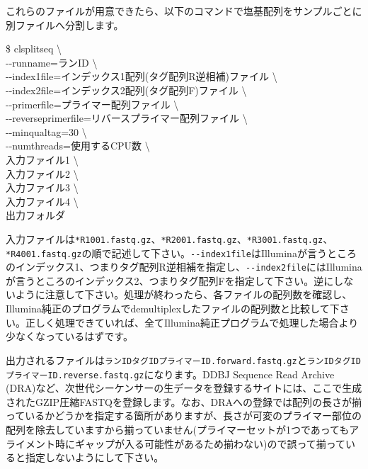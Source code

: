 \documentclass[titlepage,10pt,a4paper,english]{jsbook}
\newenvironment{cmd}{\begin{oframed}\raggedright\ttfamily\footnotesize\setlength{\baselineskip}{1.4em}}{\end{oframed}\vspace{-1em}}
\begin{document}
これらのファイルが用意できたら、以下のコマンドで塩基配列をサンプルごとに別ファイルへ分割します。
\begin{cmd}
\$ clsplitseq {\textbackslash}\\
{-}{-}runname=ランID {\textbackslash}\\
{-}{-}index1file=インデックス1配列(タグ配列R逆相補)ファイル {\textbackslash}\\
{-}{-}index2file=インデックス2配列(タグ配列F)ファイル {\textbackslash}\\
{-}{-}primerfile=プライマー配列ファイル {\textbackslash}\\
{-}{-}reverseprimerfile=リバースプライマー配列ファイル {\textbackslash}\\
{-}{-}minqualtag=30 {\textbackslash}\\
{-}{-}numthreads=使用するCPU数 {\textbackslash}\\
入力ファイル1 {\textbackslash}\\
入力ファイル2 {\textbackslash}\\
入力ファイル3 {\textbackslash}\\
入力ファイル4 {\textbackslash}\\
出力フォルダ
\end{cmd}
入力ファイルは\texttt{*{\textunderscore}R1{\textunderscore}001.fastq.gz}、\texttt{*{\textunderscore}R2{\textunderscore}001.fastq.gz}、\texttt{*{\textunderscore}R3{\textunderscore}001.fastq.gz}、\texttt{*{\textunderscore}R4{\textunderscore}001.fastq.gz}の順で記述して下さい。\texttt{{-}{-}index1file}はIlluminaが言うところのインデックス1、つまりタグ配列R逆相補を指定し、\texttt{{-}{-}index2file}にはIlluminaが言うところのインデックス2、つまりタグ配列Fを指定して下さい。逆にしないように注意して下さい。処理が終わったら、各ファイルの配列数を確認し、Illumina純正のプログラムでdemultiplexしたファイルの配列数と比較して下さい。正しく処理できていれば、全てIllumina純正プログラムで処理した場合より少なくなっているはずです。

出力されるファイルは\texttt{ランID{\textunderscore}{\textunderscore}タグID{\textunderscore}{\textunderscore}プライマーID.forward.fastq.gz}と\texttt{ランID{\textunderscore}{\textunderscore}タグID{\textunderscore}{\textunderscore}プライマーID.reverse.fastq.gz}になります。DDBJ Sequence Read Archive (DRA)など、次世代シーケンサーの生データを登録するサイトには、ここで生成されたGZIP圧縮FASTQを登録します。なお、DRAへの登録では配列の長さが揃っているかどうかを指定する箇所がありますが、長さが可変のプライマー部位の配列を除去していますから揃っていません(プライマーセットが1つであってもアライメント時にギャップが入る可能性があるため揃わない)ので誤って揃っていると指定しないようにして下さい。
\end{document}
